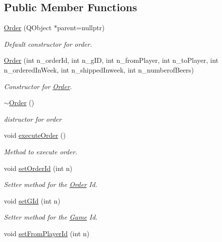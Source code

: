 \subsection*{Public Member Functions}
\begin{DoxyCompactItemize}
\item 
\hyperlink{class_order_ac162527d3f5deb0747c22bcb59829dc7}{Order} (Q\+Object $\ast$parent=nullptr)
\begin{DoxyCompactList}\small\item\em Default constructor for order. \end{DoxyCompactList}\item 
\hyperlink{class_order_a0c5d4bfa1c8d671665ddd0ecd1cf45d9}{Order} (int n\+\_\+order\+Id, int n\+\_\+g\+ID, int n\+\_\+from\+Player, int n\+\_\+to\+Player, int n\+\_\+ordered\+In\+Week, int n\+\_\+shipped\+Inweek, int n\+\_\+numberof\+Beers)
\begin{DoxyCompactList}\small\item\em Constructor for \hyperlink{class_order}{Order}. \end{DoxyCompactList}\item 
\hyperlink{class_order_a8fb25876ccbd534465f5f96ef9bb2212}{$\sim$\+Order} ()
\begin{DoxyCompactList}\small\item\em distructor for order \end{DoxyCompactList}\item 
void \hyperlink{class_order_a065c7828b1608d906dc9f2f2cc43ee35}{execute\+Order} ()
\begin{DoxyCompactList}\small\item\em Method to execute order. \end{DoxyCompactList}\item 
void \hyperlink{class_order_abb0a14e231e3b3e0d3e59405e3dd9884}{set\+Order\+Id} (int n)
\begin{DoxyCompactList}\small\item\em Setter method for the \hyperlink{class_order}{Order} Id. \end{DoxyCompactList}\item 
void \hyperlink{class_order_a15811f6d8f69a15cc5ca2558328310d6}{set\+G\+Id} (int n)
\begin{DoxyCompactList}\small\item\em Setter method for the \hyperlink{class_game}{Game} Id. \end{DoxyCompactList}\item 
void \hyperlink{class_order_a8a41cdea30959709f9c9dbdadd4f62f0}{set\+From\+Player\+Id} (int n)

\end{DoxyCompactItemize}
